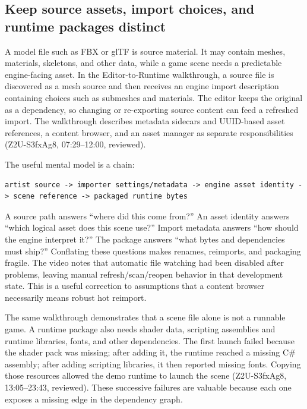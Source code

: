 \subsection{Keep source assets, import choices, and runtime packages distinct}\label{06-engine-ii-ch032-keep-source-assets-import-choices-and-runtime-packages-distinct}

\hypertarget{06-engine-ii-ch032-keep-source-assets-import-choices-and-runtime-packages-distinct}{}

A model file such as FBX or glTF is source material. It may contain meshes, materials, skeletons, and other data, while a game scene needs a predictable engine-facing asset. In the Editor-to-Runtime walkthrough, a source file is discovered as a mesh source and then receives an engine import description containing choices such as submeshes and materials. The editor keeps the original as a dependency, so changing or re-exporting source content can feed a refreshed import. The walkthrough describes metadata sidecars and UUID-based asset references, a content browser, and an asset manager as separate responsibilities (Z2U-S3fxAg8, 07:29--12:00, reviewed).

The useful mental model is a chain:

\begin{verbatim}
artist source -> importer settings/metadata -> engine asset identity -> scene reference -> packaged runtime bytes
\end{verbatim}

A source path answers ``where did this come from?'' An asset identity answers ``which logical asset does this scene use?'' Import metadata answers ``how should the engine interpret it?'' The package answers ``what bytes and dependencies must ship?'' Conflating these questions makes renames, reimports, and packaging fragile. The video notes that automatic file watching had been disabled after problems, leaving manual refresh/scan/reopen behavior in that development state. This is a useful correction to assumptions that a content browser necessarily means robust hot reimport.

The same walkthrough demonstrates that a scene file alone is not a runnable game. A runtime package also needs shader data, scripting assemblies and runtime libraries, fonts, and other dependencies. The first launch failed because the shader pack was missing; after adding it, the runtime reached a missing C\# assembly; after adding scripting libraries, it then reported missing fonts. Copying those resources allowed the demo runtime to launch the scene (Z2U-S3fxAg8, 13:05--23:43, reviewed). These successive failures are valuable because each one exposes a missing edge in the dependency graph.

